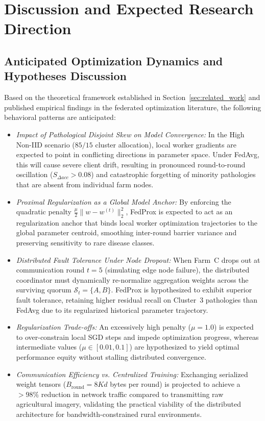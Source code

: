 \documentclass[applsci,article,submit,oneauthor,pdftex]{Definitions/mdpi}
\begin{document}
\section{Discussion and Expected Research Direction}
\label{sec:discussion}

\subsection{Anticipated Optimization Dynamics and Hypotheses Discussion}
Based on the theoretical framework established in Section~\ref{sec:related_work} and published empirical findings in the federated optimization literature, the following behavioral patterns are anticipated:
\begin{itemize}[leftmargin=*]
    \item \textit{Impact of Pathological Disjoint Skew on Model Convergence:} In the High Non-IID scenario ($85/15$ cluster allocation), local worker gradients are expected to point in conflicting directions in parameter space. Under FedAvg, this will cause severe client drift, resulting in pronounced round-to-round oscillation ($S_{\Delta acc} > 0.08$) and catastrophic forgetting of minority pathologies that are absent from individual farm nodes.
    \item \textit{Proximal Regularization as a Global Model Anchor:} By enforcing the quadratic penalty $\frac{\mu}{2}\|w - w^{(t)}\|_2^2$, FedProx is expected to act as an regularization anchor that binds local worker optimization trajectories to the global parameter centroid, smoothing inter-round barrier variance and preserving sensitivity to rare disease classes.
    \item \textit{Distributed Fault Tolerance Under Node Dropout:} When Farm~C drops out at communication round $t=5$ (simulating edge node failure), the distributed coordinator must dynamically re-normalize aggregation weights across the surviving quorum $\mathcal{S}_t = \{A, B\}$. FedProx is hypothesized to exhibit superior fault tolerance, retaining higher residual recall on Cluster~3 pathologies than FedAvg due to its regularized historical parameter trajectory.
    \item \textit{Regularization Trade-offs:} An excessively high penalty ($\mu = 1.0$) is expected to over-constrain local SGD steps and impede optimization progress, whereas intermediate values ($\mu \in [0.01, 0.1]$) are hypothesized to yield optimal performance equity without stalling distributed convergence.
    \item \textit{Communication Efficiency vs. Centralized Training:} Exchanging serialized weight tensors ($B_{\text{round}} = 8Kd$ bytes per round) is projected to achieve a $>98\%$ reduction in network traffic compared to transmitting raw agricultural imagery, validating the practical viability of the distributed architecture for bandwidth-constrained rural environments.
\end{itemize}
\end{document}
